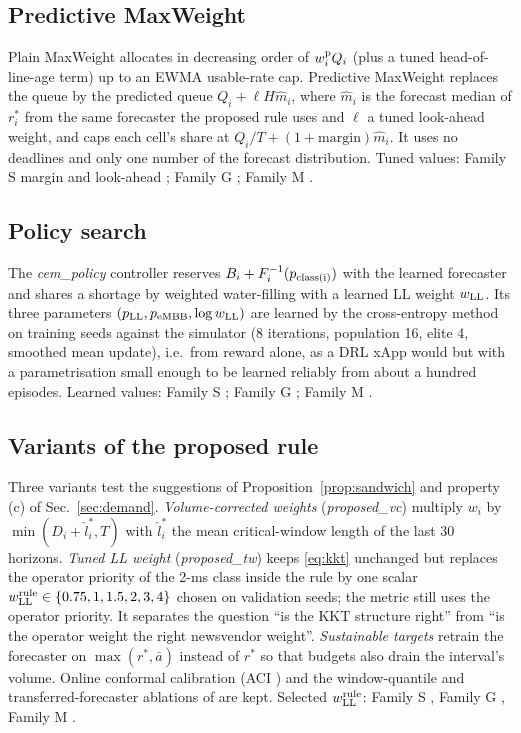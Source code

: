 \documentclass[journal]{IEEEtran}
\newcommand{\rstar}{r^{\ast}}
\begin{document}
\subsection{Predictive MaxWeight}
Plain MaxWeight allocates in decreasing order of $w_i^{\rm p}Q_i$ (plus a tuned head-of-line-age term) up to an EWMA usable-rate cap. Predictive MaxWeight \cite{huang2016} replaces the queue by the predicted queue $Q_i + \ell H\hat m_i$, where $\hat m_i$ is the forecast median of $\rstar_i$ from the same forecaster the proposed rule uses and $\ell$ a tuned look-ahead weight, and caps each cell's share at $Q_i/T + (1 + \mathrm{margin})\hat m_i$. It uses no deadlines and only one number of the forecast distribution. Tuned values: Family S margin and look-ahead \xpmwParamsS{}; Family G \xpmwParamsG{}; Family M \xpmwParamsM{}.

\subsection{Policy search}
The \emph{cem\_policy} controller reserves $B_i + F_i^{-1}(p_{\rm class(i)})$ with the learned forecaster and shares a shortage by weighted water-filling with a learned LL weight $w_{\rm LL}$. Its three parameters $(p_{\rm LL}, p_{\rm eMBB}, \log w_{\rm LL})$ are learned by the cross-entropy method \cite{rubinstein1999} on training seeds against the simulator (8 iterations, population 16, elite 4, smoothed mean update), i.e.\ from reward alone, as a DRL xApp would but with a parametrisation small enough to be learned reliably from about a hundred episodes. Learned values: Family S \xcemS{}; Family G \xcemG{}; Family M \xcemM{}.

\subsection{Variants of the proposed rule}
\label{sec:variants}
Three variants test the suggestions of Proposition~\ref{prop:sandwich} and property (c) of Sec.~\ref{sec:demand}. \emph{Volume-corrected weights} (\emph{proposed\_vc}) multiply $w_i$ by $\min(D_i + \hat l^\ast_i, T)$ with $\hat l^\ast_i$ the mean critical-window length of the last 30 horizons. \emph{Tuned LL weight} (\emph{proposed\_tw}) keeps \eqref{eq:kkt} unchanged but replaces the operator priority of the 2-ms class inside the rule by one scalar $w_{\rm LL}^{\rm rule} \in \{0.75, 1, 1.5, 2, 3, 4\}$ chosen on validation seeds; the metric still uses the operator priority. It separates the question ``is the KKT structure right'' from ``is the operator weight the right newsvendor weight''. \emph{Sustainable targets} retrain the forecaster on $\max(\rstar, \bar a)$ instead of $\rstar$ so that budgets also drain the interval's volume. Online conformal calibration (ACI \cite{gibbs2021}) and the window-quantile and transferred-forecaster ablations of \cite{ncc2027} are kept. Selected $w_{\rm LL}^{\rm rule}$: Family S \xtwS{}, Family G \xtwG{}, Family M \xtwM{}.
\end{document}
